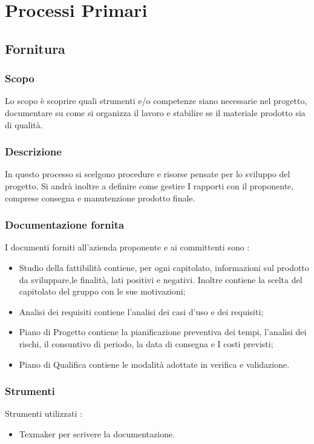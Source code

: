 \section{Processi Primari}
\subsection{Fornitura}
\subsubsection{Scopo}
Lo scopo è scoprire quali strumenti e/o competenze siano necessarie nel progetto, documentare su come si organizza il lavoro e stabilire se il materiale prodotto sia di qualità.

\subsubsection{Descrizione}
In questo processo si scelgono procedure e risorse pensate per lo sviluppo del progetto. Si andrà inoltre a definire come gestire I rapporti con il proponente, comprese consegna e manutenzione prodotto finale.

\subsubsection{Documentazione fornita}
I documenti forniti all’azienda proponente e ai committenti sono :
\begin{itemize}
  \item Studio della fattibilità contiene, per ogni capitolato, informazioni sul prodotto da sviluppare,le finalità, lati positivi e negativi. Inoltre contiene la scelta del capitolato del gruppo con le sue motivazioni;

  \item Analisi dei requisiti contiene l’analisi dei casi d’uso e dei requisiti;

  \item Piano di Progetto contiene la pianificazione preventiva dei tempi, l’analisi dei rischi, il consuntivo di periodo, la data di consegna e I costi previsti;

  \item Piano di Qualifica contiene le modalità adottate in verifica e validazione.

\end{itemize}
\subsubsection{Strumenti}
Strumenti utilizzati :
\begin{itemize}
  \item Texmaker per scrivere la documentazione.
\end{itemize}

